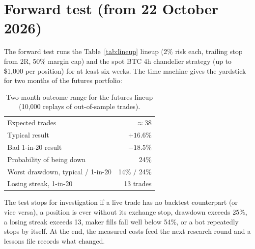 \documentclass[11pt,a4paper]{article}
\begin{document}
\section{Forward test (from 22 October 2026)}
The forward test runs the Table~\ref{tab:lineup} lineup (2\% risk each, trailing stop from 2R,
50\% margin cap) and the spot BTC 4h chandelier strategy (up to \$1{,}000 per position) for at
least six weeks. The time machine gives the yardstick for two months of the futures portfolio:

\begin{table}[h]
\centering\small
\begin{tabular}{@{}lr@{}}
\toprule
Expected trades & $\approx 38$ \\
Typical result & $+16.6\%$ \\
Bad 1-in-20 result & $-18.5\%$ \\
Probability of being down & 24\% \\
Worst drawdown, typical / 1-in-20 & 14\% / 24\% \\
Losing streak, 1-in-20 & 13 trades \\
\bottomrule
\end{tabular}
\caption{Two-month outcome range for the futures lineup (10{,}000 replays of out-of-sample trades).}
\end{table}

\noindent The test stops for investigation if a live trade has no backtest counterpart (or vice
versa), a position is ever without its exchange stop, drawdown exceeds 25\%, a losing streak
exceeds 13, maker fills fall well below 54\%, or a bot repeatedly stops by itself. At the end, the
measured costs feed the next research round and a lessons file records what changed.

\end{document}

